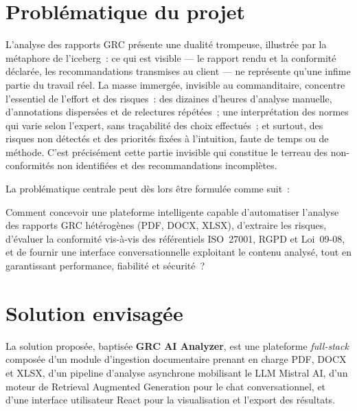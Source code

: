 \documentclass[a4paper,12pt,oneside]{report}
\begin{document}
	\section{Probl\'ematique du projet}
	
	L'analyse des rapports GRC pr\'esente une dualit\'e trompeuse, illustr\'ee par la m\'etaphore de l'iceberg~: ce qui est visible --- le rapport rendu et la conformit\'e d\'eclar\'ee, les recommandations transmises au client --- ne repr\'esente qu'une infime partie du travail r\'eel. La masse immerg\'ee, invisible au commanditaire, concentre l'essentiel de l'effort et des risques~: des dizaines d'heures d'analyse manuelle, d'annotations dispers\'ees et de relectures r\'ep\'et\'ees~; une interpr\'etation des normes qui varie selon l'expert, sans tra\c{c}abilit\'e des choix effectu\'es~; et surtout, des risques non d\'etect\'es et des priorit\'es fix\'ees \`a l'intuition, faute de temps ou de m\'ethode. C'est pr\'ecis\'ement cette partie invisible qui constitue le terreau des non-conformit\'es non identifi\'ees et des recommandations incompl\`etes.
	
	La probl\'ematique centrale peut d\`es lors \^etre formul\'ee comme suit~:
	
	\begin{tcolorbox}[problemboxstyle]
		Comment concevoir une plateforme intelligente capable d'automatiser l'analyse des rapports GRC h\'et\'erog\`enes (PDF, DOCX, XLSX), d'extraire les risques, d'\'evaluer la conformit\'e vis-\`a-vis des r\'ef\'erentiels ISO~27001, RGPD et Loi~09-08, et de fournir une interface conversationnelle exploitant le contenu analys\'e, tout en garantissant performance, fiabilit\'e et s\'ecurit\'e~?
	\end{tcolorbox}
	
	\section{Solution envisag\'ee}
	La solution propos\'ee, baptis\'ee \textbf{GRC AI Analyzer}, est une plateforme \emph{full-stack} compos\'ee d'un module d'ingestion documentaire prenant en charge PDF, DOCX et XLSX, d'un pipeline d'analyse asynchrone mobilisant le LLM Mistral AI, d'un moteur de Retrieval Augmented Generation pour le chat conversationnel, et d'une interface utilisateur React pour la visualisation et l'export des r\'esultats.
	
\end{document}
